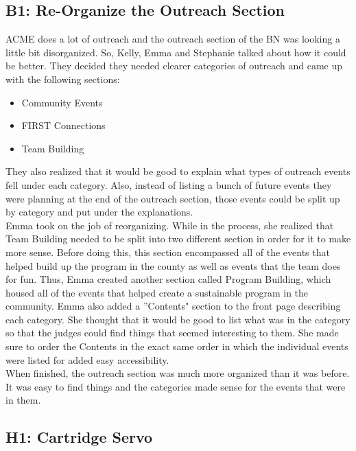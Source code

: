 \documentclass{article}
\begin{document}
\subsection{B1: Re-Organize the Outreach Section}

ACME does a lot of outreach and the outreach section of the BN was looking a little bit disorganized. So, Kelly, Emma and Stephanie talked about how it could be better. They decided they needed clearer categories of outreach and came up with the following sections: 

\begin{itemize}
    \item Community Events
    \item FIRST Connections
    \item Team Building
\end{itemize}

They also realized that it would be good to explain what types of outreach events fell under each category. Also, instead of listing a bunch of future events they were planning at the end of the outreach section, those events could be split up by category and put under the explanations. \\

Emma took on the job of reorganizing. While in the process, she realized that Team Building needed to be split into two different section in order for it to make more sense. Before doing this, this section encompassed all of the events that helped build up the program in the county as well as events that the team does for fun. Thus, Emma created another section called Program Building, which housed all of the events that helped create a sustainable program in the community. Emma also added a ''Contents" section to the front page describing each category. She thought that it would be good to list what was in the category so that the judges could find things that seemed interesting to them. She made sure to order the Contents in the exact same order in which the individual events were listed for added easy accessibility. \\

When finished, the outreach section was much more organized than it was before. It was easy to find things and the categories made sense for the events that were in them. 
\subsection{H1: Cartridge Servo}
\end{document}
